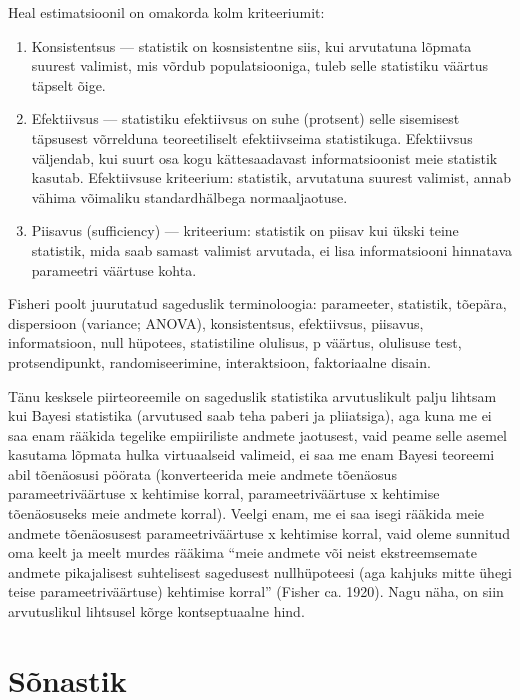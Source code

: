\documentclass[]{book}
\begin{document}
Heal estimatsioonil on omakorda kolm kriteeriumit:

\begin{enumerate}
\def\labelenumi{\arabic{enumi}.}
\item
  Konsistentsus --- statistik on kosnsistentne siis, kui arvutatuna lõpmata suurest valimist, mis võrdub populatsiooniga, tuleb selle statistiku väärtus täpselt õige.
\item
  Efektiivsus --- statistiku efektiivsus on suhe (protsent) selle sisemisest täpsusest võrrelduna teoreetiliselt efektiivseima statistikuga. Efektiivsus väljendab, kui suurt osa kogu kättesaadavast informatsioonist meie statistik kasutab. Efektiivsuse kriteerium: statistik, arvutatuna suurest valimist, annab vähima võimaliku standardhälbega normaaljaotuse.
\item
  Piisavus (sufficiency) --- kriteerium: statistik on piisav kui ükski teine statistik, mida saab samast valimist arvutada, ei lisa informatsiooni hinnatava parameetri väärtuse kohta.
\end{enumerate}

Fisheri poolt juurutatud sageduslik terminoloogia: parameeter, statistik, tõepära, dispersioon (variance; ANOVA), konsistentsus, efektiivsus, piisavus, informatsioon, null hüpotees, statistiline olulisus, p väärtus, olulisuse test, protsendipunkt, randomiseerimine, interaktsioon, faktoriaalne disain.

Tänu kesksele piirteoreemile on sageduslik statistika arvutuslikult palju lihtsam kui Bayesi statistika (arvutused saab teha paberi ja pliiatsiga), aga kuna me ei saa enam rääkida tegelike empiiriliste andmete jaotusest, vaid peame selle asemel kasutama lõpmata hulka virtuaalseid valimeid, ei saa me enam Bayesi teoreemi abil tõenäosusi pöörata (konverteerida meie andmete tõenäosus parameetriväärtuse x kehtimise korral, parameetriväärtuse x kehtimise tõenäosuseks meie andmete korral). Veelgi enam, me ei saa isegi rääkida meie andmete tõenäosusest parameetriväärtuse x kehtimise korral, vaid oleme sunnitud oma keelt ja meelt murdes rääkima ``meie andmete või neist ekstreemsemate andmete pikajalisest suhtelisest sagedusest nullhüpoteesi (aga kahjuks mitte ühegi teise parameetriväärtuse) kehtimise korral'' (Fisher ca. 1920). Nagu näha, on siin arvutuslikul lihtsusel kõrge kontseptuaalne hind.

\hypertarget{sonastik}{%
\chapter{Sõnastik}\label{sonastik}}
\end{document}
